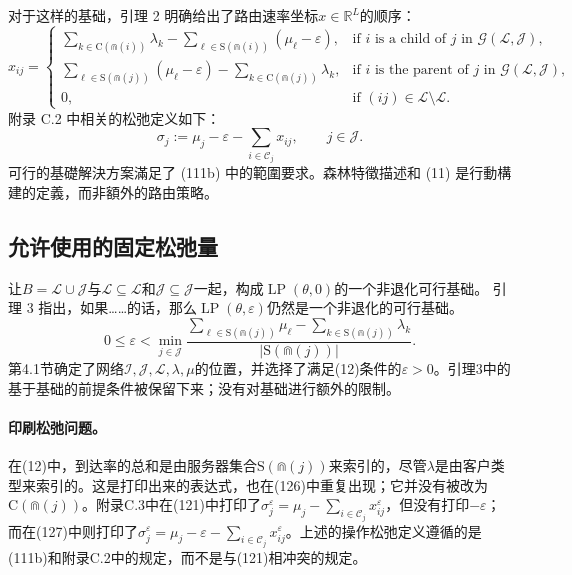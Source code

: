 \documentclass{article}
\begin{document}
对于这样的基础，引理 2 明确给出了路由速率坐标$x\in\mathbb R^L$的顺序：
\begin{equation}
x_{ij}=\begin{cases}
\displaystyle\sum_{k\in\mathrm C(\Cap(i))}\lambda_k
-\sum_{\ell\in\mathrm S(\Cap(i))}(\mu_\ell-\varepsilon),
&\text{if }i\text{ is a child of }j\text{ in }\mathcal G(\mathscr L,\mathscr J),\\[6pt]
\displaystyle\sum_{\ell\in\mathrm S(\Cap(j))}(\mu_\ell-\varepsilon)
-\sum_{k\in\mathrm C(\Cap(j))}\lambda_k,
&\text{if }i\text{ is the parent of }j\text{ in }\mathcal G(\mathscr L,\mathscr J),\\[6pt]
0,&\text{if }(ij)\in\mathcal L\setminus\mathscr L.
\end{cases}
\tag{11}
\end{equation}
附录 C.2 中相关的松弛定义如下：
\[
\sigma_j:=\mu_j-\varepsilon-\sum_{i\in\mathcal C_j}x_{ij},
\qquad j\in\mathcal J.
\]
可行的基礎解決方案滿足了 (111b) 中的範圍要求。森林特徵描述和 (11) 是行動構建的定義，而非額外的路由策略。

\subsection*{允许使用的固定松弛量}

让$B=\mathscr L\cup\mathscr J$与$\mathscr L\subseteq\mathcal L$和$\mathscr J\subseteq\mathcal J$一起，构成$\operatorname{LP}(\theta,0)$的一个非退化可行基础。 引理 3 指出，如果……的话，那么$\operatorname{LP}(\theta,\varepsilon)$仍然是一个非退化的可行基础。
\begin{equation}
0\leq\varepsilon<\min_{j\in\mathcal J}
\frac{\displaystyle\sum_{\ell\in\mathrm S(\Cap(j))}\mu_\ell
-\displaystyle\sum_{k\in\mathrm S(\Cap(j))}\lambda_k}
{|\mathrm S(\Cap(j))|}.
\tag{12}
\end{equation}
第4.1节确定了网络$\mathcal I,\mathcal J,\mathcal L,\lambda,\mu$的位置，并选择了满足(12)条件的$\varepsilon>0$。引理3中的基于基础的前提条件被保留下来；没有对基础进行额外的限制。

\paragraph{印刷松弛问题。}
在(12)中，到达率的总和是由服务器集合$\mathrm S(\Cap(j))$来索引的，尽管$\lambda$是由客户类型来索引的。这是打印出来的表达式，也在(126)中重复出现；它并没有被改为$\mathrm C(\Cap(j))$。附录C.3中在(121)中打印了$\sigma_j^\varepsilon=\mu_j-\sum_{i\in\mathcal C_j}x_{ij}^\varepsilon$，但没有打印$-\varepsilon$；而在(127)中则打印了$\sigma_j^\varepsilon=\mu_j-\varepsilon-\sum_{i\in\mathcal C_j}x_{ij}^\varepsilon$。上述的操作松弛定义遵循的是(111b)和附录C.2中的规定，而不是与(121)相冲突的规定。
\end{document}
